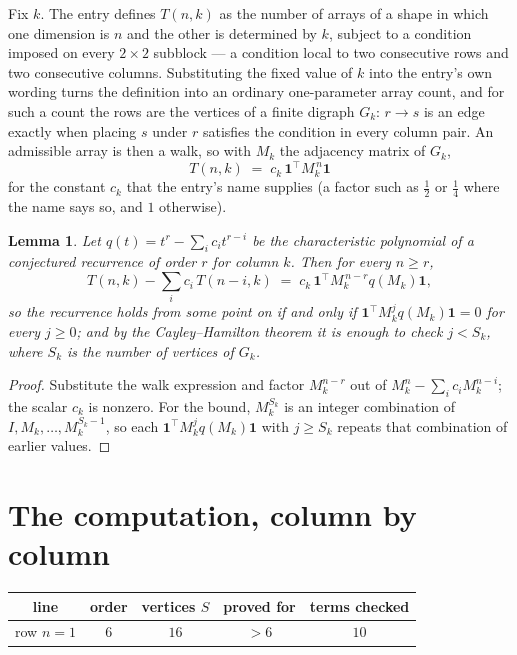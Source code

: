 \documentclass[11pt,a4paper]{article}
\theoremstyle{plain}
\newtheorem{lemma}[theorem]{Lemma}
\theoremstyle{definition}
\begin{document}
Fix $k$. The entry defines $T(n,k)$ as the number of arrays of a shape in which one dimension
is $n$ and the other is determined by $k$, subject to a condition imposed on every
$2\times2$ subblock --- a condition local to two consecutive rows and two consecutive columns.
Substituting the fixed value of $k$ into the entry's own wording turns the definition into an
ordinary one-parameter array count, and for such a count the rows are the vertices of a finite
digraph $G_k$: $r\to s$ is an edge exactly when placing $s$ under $r$ satisfies the condition
in every column pair. An admissible array is then a walk, so with $M_k$ the adjacency matrix
of $G_k$,
\[
T(n,k)\;=\;c_k\,\mathbf{1}^{\!\top}M_k^{\,n}\mathbf{1}
\]
for the constant $c_k$ that the entry's name supplies (a factor such as $\tfrac12$ or
$\tfrac14$ where the name says so, and $1$ otherwise).

\begin{lemma}\label{lem:crit}
Let $q(t)=t^{r}-\sum_i c_it^{r-i}$ be the characteristic polynomial of a conjectured
recurrence of order $r$ for column $k$. Then for every $n\ge r$,
\[
T(n,k)-\sum_i c_i\,T(n-i,k)\;=\;c_k\,\mathbf{1}^{\!\top}M_k^{\,n-r}q(M_k)\mathbf{1},
\]
so the recurrence holds from some point on if and only if
$\mathbf{1}^{\!\top}M_k^{j}q(M_k)\mathbf{1}=0$ for every $j\ge0$; and by the
Cayley--Hamilton theorem it is enough to check $j<S_k$, where $S_k$ is the number of vertices
of $G_k$.
\end{lemma}

\begin{proof}
Substitute the walk expression and factor $M_k^{n-r}$ out of $M_k^{n}-\sum_ic_iM_k^{n-i}$;
the scalar $c_k$ is nonzero. For the bound, $M_k^{S_k}$ is an integer combination of
$I,M_k,\dots,M_k^{S_k-1}$, so each $\mathbf{1}^{\!\top}M_k^{j}q(M_k)\mathbf{1}$ with
$j\ge S_k$ repeats that combination of earlier values.
\end{proof}

\section{The computation, column by column}

\begin{center}
\begin{tabular}{ccccc}
line & order & vertices $S$ & proved for & terms checked \\ \hline
row $n$$=1$ & $6$ & $16$ & $>6$ & $10$ \\
\end{tabular}
\end{center}
\end{document}
